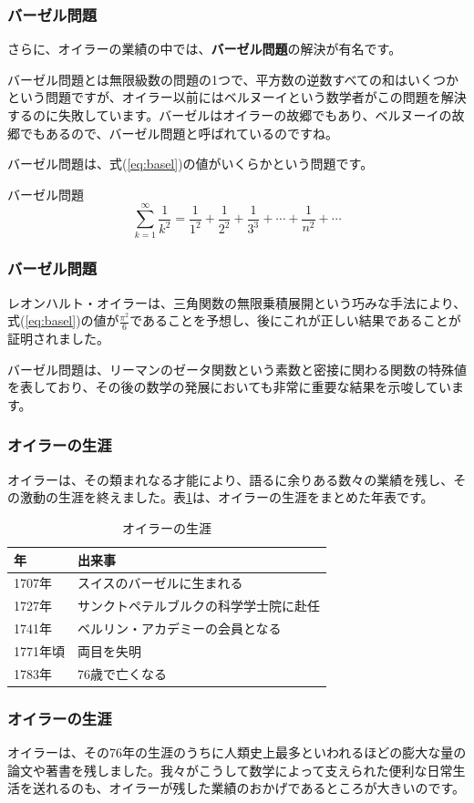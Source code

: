 \documentclass{beamer}
\begin{document}
\begin{frame}\frametitle{バーゼル問題}

さらに、オイラーの業績の中では、\textbf{バーゼル問題}の解決が有名です。

バーゼル問題とは無限級数の問題の1つで、平方数の逆数すべての和はいくつかという問題ですが、オイラー以前にはベルヌーイという数学者がこの問題を解決するのに失敗しています。バーゼルはオイラーの故郷でもあり、ベルヌーイの故郷でもあるので、バーゼル問題と呼ばれているのですね。\pause

バーゼル問題は、式(\ref{eq:basel})の値がいくらかという問題です。

\begin{block}{バーゼル問題}
\begin{equation}
\sum_{k=1}^{\infty} \frac{1}{k^2} = \frac{1}{1^2} + \frac{1}{2^2} + \frac{1}{3^3} + \cdots + \frac{1}{n^2} + \cdots \label{eq:basel}
\end{equation}
\end{block}
\end{frame}


\begin{frame}\frametitle{バーゼル問題}
レオンハルト・オイラーは、三角関数の無限乗積展開という巧みな手法により、式(\ref{eq:basel})の値が$\frac{\pi^2}{6}$であることを予想し、後にこれが正しい結果であることが証明されました。

バーゼル問題は、リーマンのゼータ関数という素数と密接に関わる関数の特殊値を表しており、その後の数学の発展においても非常に重要な結果を示唆しています。
\end{frame}

\begin{frame}\frametitle{オイラーの生涯}
オイラーは、その類まれなる才能により、語るに余りある数々の業績を残し、その激動の生涯を終えました。表\ref{tab:euler}は、オイラーの生涯をまとめた年表です。\pause

\begin{table}[htbp]
\centering
\caption{オイラーの生涯}
\label{tab:euler}
\begin{tabular}{|l|l|}
\hline
年 & 出来事 \\ \hline \hline
1707年 & スイスのバーゼルに生まれる\\ \hline
1727年 & サンクトペテルブルクの科学学士院に赴任 \\ \hline
1741年 & ベルリン・アカデミーの会員となる \\ \hline
1771年頃 & 両目を失明 \\ \hline
1783年 & 76歳で亡くなる \\ \hline
\end{tabular}
\end{table}
\end{frame}

\begin{frame}\frametitle{オイラーの生涯}
オイラーは、その76年の生涯のうちに人類史上最多といわれるほどの膨大な量の論文や著書を残しました。我々がこうして数学によって支えられた便利な日常生活を送れるのも、オイラーが残した業績のおかげであるところが大きいのです。
\end{frame}
\end{document}

